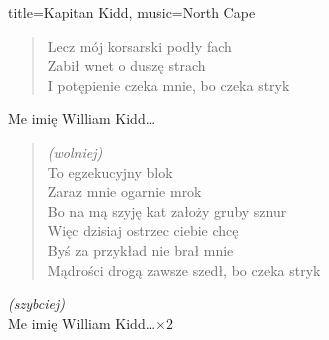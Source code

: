 \begin{song}{title={Kapitan Kidd}, music={North Cape}}
\begin{multicols}{2}
\begin{verse}
        Lecz mój korsarski podły fach \\
        Zabił wnet o duszę strach \\
        I potępienie czeka mnie, bo czeka stryk
    \end{verse}
    \begin{chorus}
        Me imię William Kidd\ldots
    \end{chorus}
    \begin{verse}
        \textit{(wolniej)} \\
        To egzekucyjny blok \\
        Zaraz mnie ogarnie mrok \\
        Bo na mą szyję kat założy gruby sznur \\
        Więc dzisiaj ostrzec ciebie chcę \\
        Byś za przykład nie brał mnie \\
        Mądrości drogą zawsze szedł, bo czeka stryk
    \end{verse}
    \begin{chorus}
        \textit{(szybciej)} \\
        Me imię William Kidd\ldots $\times 2$
    \end{chorus}
\end{multicols}
\end{song}

